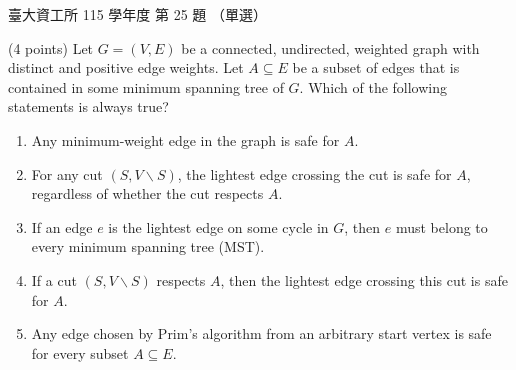 \begin{pastexam}[label={px:ntu-115-dsa-25}]{臺大資工所 115 學年度 第 25 題}
（單選）

(4 points) Let $G=(V,E)$ be a connected, undirected, weighted graph with distinct and positive edge weights. Let $A\subseteq E$ be a subset of edges that is contained in some minimum spanning tree of $G$. Which of the following statements is always true?
\begin{enumerate}[label=(\Alph*)]
\item Any minimum-weight edge in the graph is safe for $A$.
\item For any cut $(S,V\backslash S)$, the lightest edge crossing the cut is safe for $A$, regardless of whether the cut respects $A$.
\item If an edge $e$ is the lightest edge on some cycle in $G$, then $e$ must belong to every minimum spanning tree (MST).
\item If a cut $(S,V\backslash S)$ respects $A$, then the lightest edge crossing this cut is safe for $A$.
\item Any edge chosen by Prim's algorithm from an arbitrary start vertex is safe for every subset $A\subseteq E$.
\end{enumerate}
\end{pastexam}

